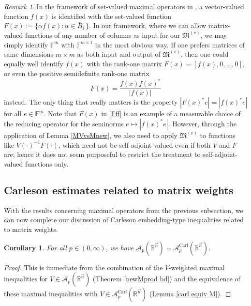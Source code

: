 \documentclass[11pt, reqno]{amsart}
\newtheorem{corollary}[theorem]{Corollary}
\theoremstyle{definition}
\theoremstyle{remark}
\newtheorem{remark}[theorem]{Remark}
\numberwithin{equation}{section}
\newcommand{\A}{\mathscr A}
\newcommand{\F}{\mathbb F}
\newcommand{\M}{\mathfrak M}
\newcommand{\R}{\mathbb R}
\newcommand{\vn}{\vec n}
\newcommand{\abs}[1]{|#1|}
\newcommand{\Carl}{\mathrm{Carl}}
\newcommand{\AC}{\A^{\Carl}}
\begin{document}
\begin{remark}
In the framework of set-valued maximal operators in \cite{BCU,Vuo24}, a vector-valued function $f(x)$ is identified with the set-valued function $F(x):=\{\alpha f(x):\alpha\in\bar B_{\F}\}$. In our framework, where we can allow matrix-valued functions of any number of columns as input for our $\M^{(v)}$, we may simply identify $\F^m$ with $\F^{m\times 1}$ in the most obvious way. If one prefers matrices of same dimensions $m\times m$ as both input and output of $\M^{(v)}$, then one could equally well identify $f(x)$ with the rank-one matrix $F(x)=[f(x),0,\ldots,0]$, or even the positive semidefinite rank-one matrix
\begin{equation}\label{Fff}
F(x)=\frac{f(x)f(x)^*}{\abs{f(x)}}
\end{equation}
instead. The only thing that really matters is the property $\abs{F(x)^*e}=\abs{f(x)^*e}$ for all $e\in\F^m$. Note that $F(x)$ in \eqref{Fff} is an example of a measurable choice of the reducing operator for the seminorms $e\mapsto\abs{f(x)^*e}$. However, through the application of Lemma \ref{MVvsMnew}, we also need to apply $\M^{(v)}$ to functions like $V(\cdot)^{-1}F(\cdot)$, which need not be self-adjoint-valued even if both $V$ and $F$ are; hence it does not seem purposeful to restrict the treatment to self-adjoint-valued functions only.
\end{remark}

\subsection{Carleson estimates related to matrix weights} \label{Carl special3}

With the results concerning maximal operators from the previous subsection, we can now complete our discussion of Carleson embedding-type inequalities related to matrix weights.

\begin{corollary}\label{Ap always ACp}
For all $p\in(0,\infty)$, we have $\A_p(\R^{\vn})=\AC_p(\R^{\vn})$.
\end{corollary}

\begin{proof}
This is immediate from the combination of the $V$-weighted maximal inequalities for $V\in\A_p(\R^{\vn})$ (Theorem \ref{newMprod bd}) and the equivalence of these maximal inequalities with $V\in\AC_p(\R^{\vn})$ (Lemma \ref{carl equiv M}).
\end{proof}
\end{document}
